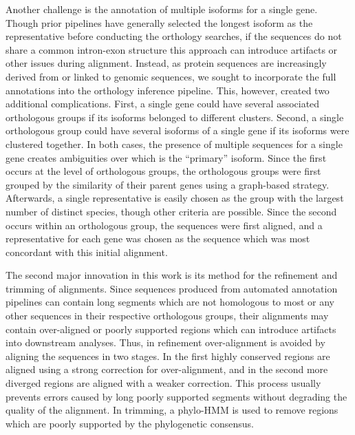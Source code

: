 Another challenge is the annotation of multiple isoforms for a single gene. Though prior pipelines have generally selected the longest isoform as the representative before conducting the orthology searches, if the sequences do not share a common intron-exon structure this approach can introduce artifacts or other issues during alignment. Instead, as protein sequences are increasingly derived from or linked to genomic sequences, we sought to incorporate the full annotations into the orthology inference pipeline. This, however, created two additional complications. First, a single gene could have several associated orthologous groups if its isoforms belonged to different clusters. Second, a single orthologous group could have several isoforms of a single gene if its isoforms were clustered together. In both cases, the presence of multiple sequences for a single gene creates ambiguities over which is the ``primary'' isoform. Since the first occurs at the level of orthologous groups, the orthologous groups were first grouped by the similarity of their parent genes using a graph-based strategy. Afterwards, a single representative is easily chosen as the group with the largest number of distinct species, though other criteria are possible. Since the second occurs within an orthologous group, the sequences were first aligned, and a representative for each gene was chosen as the sequence which was most concordant with this initial alignment.

The second major innovation in this work is its method for the refinement and trimming of alignments. Since sequences produced from automated annotation pipelines can contain long segments which are not homologous to most or any other sequences in their respective orthologous groups, their alignments may contain over-aligned or poorly supported regions which can introduce artifacts into downstream analyses. Thus, in refinement over-alignment is avoided by aligning the sequences in two stages. In the first highly conserved regions are aligned using a strong correction for over-alignment, and in the second more diverged regions are aligned with a weaker correction. This process usually prevents errors caused by long poorly supported segments without degrading the quality of the alignment. In trimming, a phylo-HMM is used to remove regions which are poorly supported by the phylogenetic consensus.

